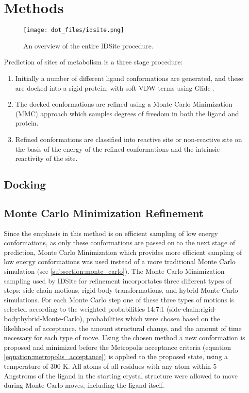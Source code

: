 \section{Methods}
\label{section:p450/methods}

\begin{figure}[h]
\centering
\texttt{[image: dot\_files/idsite.png]}
\caption{An overview of the entire IDSite procedure.}
\label{fig:idsite_overview}
\end{figure}

Prediction of sites of metabolism is a three stage procedure:
\begin{enumerate}
\item Initially a number of different ligand conformations are generated, and these are docked into a rigid protein, with soft VDW terms using Glide \cite{halgren2004glide,friesner2004glide}.
\item The docked conformations are refined using a Monte Carlo Minimization (MMC) approach which samples degrees of freedom in both the ligand and protein.
\item Refined conformations are classified into reactive site or non-reactive site on the basis of the energy of the refined conformations and the intrinsic reactivity of the site. \cite{li2011idsite}
\end{enumerate}

\subsection{Docking}
\label{subsection:p450/docking}


\subsection{Monte Carlo Minimization Refinement}
\label{subsection:p450/mcm}
Since the emphasis in this method is on efficient sampling of low energy conformations, as only these conformations are passed on to the next stage of prediction, Monte Carlo Minimization which provides more efficient sampling of low energy conformations was used instead of a more traditional Monte Carlo simulation (see \ref{subsection:monte_carlo}).
The Monte Carlo Minimization sampling used by IDSite for refinement incorportates three different types of steps: side chain motions, rigid body transformations, and hybrid Monte Carlo simulations.
For each Monte Carlo step one of these three types of motions is selected according to the weighted probabilities 14:7:1 (side-chain:rigid-body:hybrid-Monte-Carlo), probabilities which were chosen based on the likelihood of acceptance, the amount structural change, and the amount of time necessary for each type of move.
Using the chosen method a new conformation is proposed and minimized before the Metropolis acceptance criteria (equation \ref{equation:metropolis_acceptance}) is applied to the proposed state, using a temperature of 300 K.
All atoms of all residues with any atom within 5 Angstroms of the ligand in the starting crystal structure were allowed to move during Monte Carlo moves, including the ligand itself.

